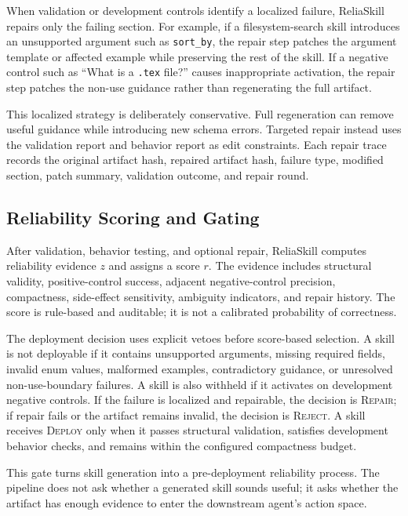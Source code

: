 \documentclass[11pt]{article}
\newcommand{\method}{ReliaSkill}
\begin{document}
When validation or development controls identify a localized failure, \method{} repairs only the failing section. For example, if a filesystem-search skill introduces an unsupported argument such as \texttt{sort\_by}, the repair step patches the argument template or affected example while preserving the rest of the skill. If a negative control such as ``What is a \texttt{.tex} file?'' causes inappropriate activation, the repair step patches the non-use guidance rather than regenerating the full artifact.

This localized strategy is deliberately conservative. Full regeneration can remove useful guidance while introducing new schema errors. Targeted repair instead uses the validation report and behavior report as edit constraints. Each repair trace records the original artifact hash, repaired artifact hash, failure type, modified section, patch summary, validation outcome, and repair round.

\subsection{Reliability Scoring and Gating}

After validation, behavior testing, and optional repair, \method{} computes reliability evidence $z$ and assigns a score $r$. The evidence includes structural validity, positive-control success, adjacent negative-control precision, compactness, side-effect sensitivity, ambiguity indicators, and repair history. The score is rule-based and auditable; it is not a calibrated probability of correctness.

The deployment decision uses explicit vetoes before score-based selection. A skill is not deployable if it contains unsupported arguments, missing required fields, invalid enum values, malformed examples, contradictory guidance, or unresolved non-use-boundary failures. A skill is also withheld if it activates on development negative controls. If the failure is localized and repairable, the decision is \textsc{Repair}; if repair fails or the artifact remains invalid, the decision is \textsc{Reject}. A skill receives \textsc{Deploy} only when it passes structural validation, satisfies development behavior checks, and remains within the configured compactness budget.

This gate turns skill generation into a pre-deployment reliability process. The pipeline does not ask whether a generated skill sounds useful; it asks whether the artifact has enough evidence to enter the downstream agent's action space.
\end{document}
